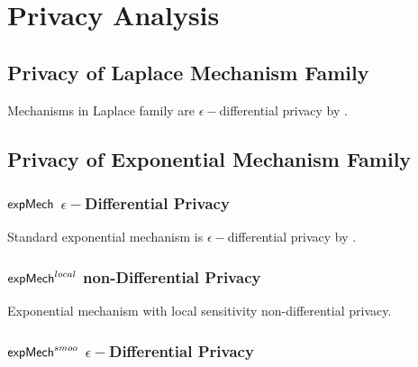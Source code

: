 \documentclass{article}
\begin{document}
\section{Privacy Analysis}

\subsection{Privacy of Laplace Mechanism Family}
Mechanisms in Laplace family are $\epsilon-$differential privacy by \cite{dwork2014algorithmic}.

\subsection{Privacy of Exponential Mechanism Family}
\subsubsection{$\mathsf{expMech}$ $\epsilon-$Differential Privacy}
Standard exponential mechanism is $\epsilon-$differential privacy by \cite{dwork2014algorithmic}.

\subsubsection{$\mathsf{expMech}^{local}$ non-Differential Privacy}
Exponential mechanism with local sensitivity non-differential privacy.

\subsubsection{$\mathsf{expMech}^{smoo}$ $\epsilon-$Differential Privacy}
\end{document}
